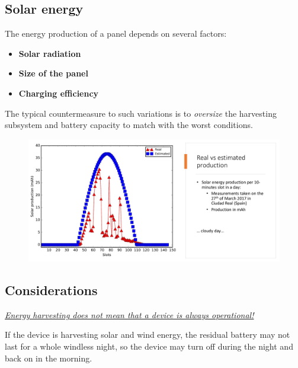 \subsection{Solar energy}
\begin{paracol}{2}
   \colfill
   The energy production of a panel depends on several factors:
   \begin{itemize}
      \item \textbf{Solar radiation}\\
      \item \textbf{Size of the panel}
      \item \textbf{Charging efficiency}
   \end{itemize}
   The typical countermeasure to such variations is to \textit{oversize} the harvesting subsystem and battery capacity to match with the worst conditions. 
   \colfill
   \switchcolumn
   \begin{figure}[htbp]
      \centering
      \includegraphics{images/solarharvesting.png}
      \label{fig:solarharvesting.png}
   \end{figure}
\end{paracol}


\subsection{Considerations}
\begin{center}
   \textit{\ul{Energy harvesting does not mean that a device is always operational!}}
\end{center}

If the device is harvesting solar and wind energy, the residual battery may not last for a whole windless night, so the device may turn off during the night and back on in the morning. 

